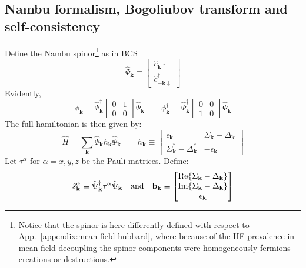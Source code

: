 \subsection{Nambu formalism, Bogoliubov transform and self-consistency}\label{subsec:nambu-formalism-mean-field-extended-hubbard}

Define the Nambu spinor\footnote{
	Notice that the spinor is here differently defined with respect to App.~\ref{appendix:mean-field-hubbard}, where because of the HF prevalence in mean-field decoupling the spinor components were homogeneously fermions creations or destructions.
} as in BCS
\[
	\hat \Psi_\mathbf{k} \equiv \begin{bmatrix}
		\hat c_{\mathbf{k}\uparrow} \\
		\hat c_{-\mathbf{k}\downarrow}^\dagger
	\end{bmatrix}
\]
Evidently,
\begin{equation}\label{eq:extended-hubbard-phi-psi-expressions}
	\phi_\mathbf{k} = \hat \Psi_\mathbf{k}^\dagger \begin{bmatrix}
		0 & 1 \\ 0 & 0
	\end{bmatrix} \hat \Psi_\mathbf{k}
	\qquad
	\phi_\mathbf{k}^\dagger = \hat \Psi_\mathbf{k}^\dagger \begin{bmatrix}
		0 & 0 \\ 1 & 0
	\end{bmatrix} \hat \Psi_\mathbf{k}
\end{equation}
The full hamiltonian is then given by:
\begin{equation}\label{eq:extended-hubbard-hamiltonian-nambu-bogoliubov}
	\hat H = \sum_\mathbf{k} \hat \Psi_\mathbf{k} h_\mathbf{k} \hat \Psi_\mathbf{k}
	\qquad
	h_\mathbf{k} \equiv \begin{bmatrix}
		\epsilon_\mathbf{k} & \Sigma_\mathbf{k} - \Delta_\mathbf{k} \\
		\Sigma_\mathbf{k}^* - \Delta_\mathbf{k}^* & - \epsilon_\mathbf{k}
	\end{bmatrix}
\end{equation}
Let $\tau^\alpha$ for $\alpha = x,y,z$ be the Pauli matrices. Define:
\[
	\hat s_\mathbf{k}^\alpha \equiv \hat \Psi_\mathbf{k}^\dagger \tau^\alpha \hat \Psi_\mathbf{k}
	\qq{and}
	\mathbf{b}_\mathbf{k} \equiv \begin{bmatrix}
		\Re{\Sigma_\mathbf{k}-\Delta_\mathbf{k}} \\
		\Im{\Sigma_\mathbf{k}-\Delta_\mathbf{k}} \\ \epsilon_\mathbf{k}
	\end{bmatrix}
\]
